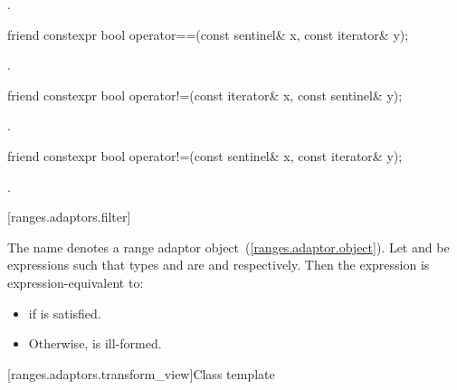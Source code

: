 \begin{itemdescr}
\pnum
\returns {}.
\end{itemdescr}

%
\begin{itemdecl}
friend constexpr bool operator==(const sentinel& x, const iterator& y);
\end{itemdecl}

\begin{itemdescr}
\pnum
\returns {}.
\end{itemdescr}

%
\begin{itemdecl}
friend constexpr bool operator!=(const iterator& x, const sentinel& y);
\end{itemdecl}

\begin{itemdescr}
\pnum
\returns {}.
\end{itemdescr}

%
\begin{itemdecl}
friend constexpr bool operator!=(const sentinel& x, const iterator& y);
\end{itemdecl}

\begin{itemdescr}
\pnum
\returns {}.
\end{itemdescr}


[ranges.adaptors.filter]{}

\pnum
The name  denotes a range adaptor
object~(\ref{ranges.adaptor.object}). Let  and  be expressions such
that types  and  are  and 
respectively. Then the expression  is expression-equivalent to:

\begin{itemize}
\item {} if
is satisfied.
\item Otherwise,  is ill-formed.
\end{itemize}

[ranges.adaptors.transform_view]{Class template }

